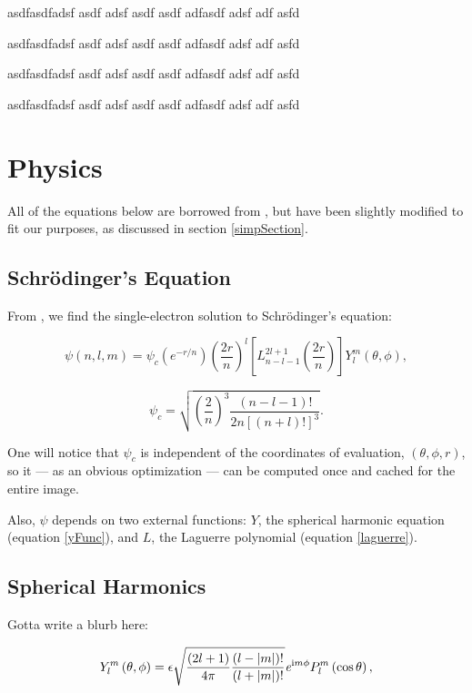 \documentclass{acmsiggraph}
\begin{document}
asdfasdfadsf asdf adsf asdf asdf adfasdf adsf adf asfd

asdfasdfadsf asdf adsf asdf asdf adfasdf adsf adf asfd

asdfasdfadsf asdf adsf asdf asdf adfasdf adsf adf asfd

asdfasdfadsf asdf adsf asdf asdf adfasdf adsf adf asfd

\section{Physics}

All of the equations below are borrowed from \cite{quantumBook}, but have been slightly modified to fit our purposes, as discussed in section \ref{simpSection}.

\subsection{Schr\"{o}dinger's Equation}

From \cite{quantumBook}, we find the single-electron solution to Schr\"{o}dinger's equation:

\begin{equation}\label{psi}
\psi\left(n, l, m\right)=\psi_c
\left(\mathit{e}^{-r/n}\right)
\left(\frac{2r}{n}\right)^l
\left[L_{n-l-1}^{2l+1}
    \left(\frac{2r}{n}\right)\right]
Y_l^m\left(\theta,\phi\right),
\end{equation}

\begin{equation}\label{psiConstant}
\psi_c=\sqrt{\left(\frac{2}{n}\right)^3
    \frac{\left(n-l-1\right)!}{2n\left[\left(n+l\right)!\right]^3}}.
\end{equation}

One will notice that $\psi_c$ is independent of the coordinates of evaluation, $\left(\theta, \phi, r\right)$, so it --- as an obvious optimization --- can be computed once and cached for the entire image.

Also, $\psi$ depends on two external functions: $Y$, the spherical harmonic equation (equation \ref{yFunc}), and $L$, the Laguerre polynomial (equation \ref{laguerre}).

\subsection{Spherical Harmonics\label{sphericalHarmonics}}

Gotta write a blurb here:

\begin{equation}\label{yFunc}
Y_l^m\left(\theta,\phi\right)=\epsilon
\sqrt{\frac{\left(2l+1\right)}{4\pi}
    \frac{\left(l-\left|m\right|\right)!}{\left(l+\left|m\right|\right)!}}
\mathit{e}^{{\rm i}m\phi}
P^m_l\left(\cos\theta\right),
\end{equation}
\end{document}
